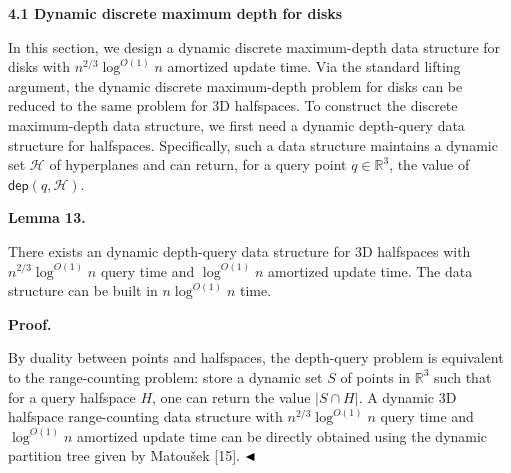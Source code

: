 \documentclass[10pt,a4paper]{article}
\begin{document}
\par
\par
\par\medskip\noindent\textbf{4.1 Dynamic discrete maximum depth for disks}\par
In this section, we design a dynamic discrete maximum-depth data structure for disks with $n^{2/3}\log^{O(1)}n$ amortized update time. Via the standard lifting argument, the dynamic discrete maximum-depth problem for disks can be reduced to the same problem for 3D halfspaces. To construct the discrete maximum-depth data structure, we first need a dynamic depth-query data structure for halfspaces. Specifically, such a data structure maintains a dynamic set $\mathcal{H}$ of hyperplanes and can return, for a query point $q\in\mathbb{R}^{3}$, the value of $\mathsf{dep}(q,\mathcal{H})$.
\par
\par
\par\medskip\noindent\textbf{Lemma 13.}\par
There exists an dynamic depth-query data structure for 3D halfspaces with $n^{2/3}\log^{O(1)}n$ query time and $\log^{O(1)}n$ amortized update time. The data structure can be built in $n\log^{O(1)}n$ time.
\par
\par
\par
\par\medskip\noindent\textbf{Proof.}\par
By duality between points and halfspaces, the depth-query problem is equivalent to the range-counting problem: store a dynamic set $S$ of points in $\mathbb{R}^{3}$ such that for a query halfspace $H$, one can return the value $|S\cap H|$. A dynamic 3D halfspace range-counting data structure with $n^{2/3}\log^{O(1)}n$ query time and $\log^{O(1)}n$ amortized update time can be directly obtained using the dynamic partition tree given by Matoušek [15]. $\hfill\blacktriangleleft$
\par
\par
\end{document}
